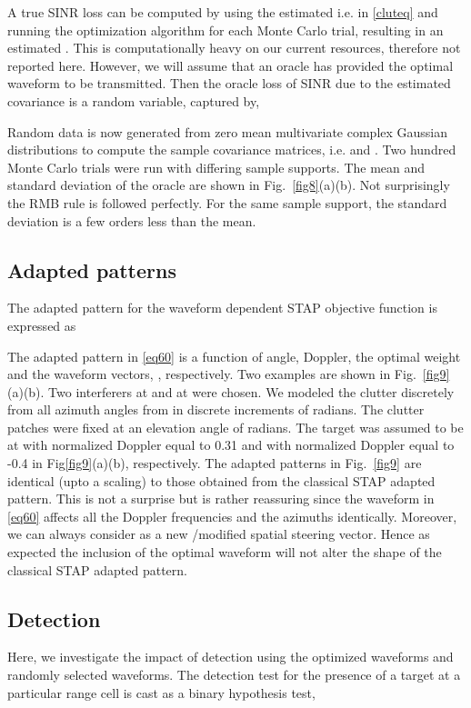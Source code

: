 \documentclass[11pt,draftclsnofoot,onecolumn]{IEEEtran}
\theoremstyle{definition}
\theoremstyle{remark}
\begin{document}
A true SINR loss can be computed  by using the estimated i.e.   in \eqref{cluteq}  and running the optimization algorithm for each Monte Carlo trial, resulting in an estimated . This is computationally heavy  on our current resources, therefore not reported here.
However, we will assume that an oracle has provided the optimal waveform to be transmitted. Then the oracle loss of SINR due to the estimated covariance  is a  random variable, captured by,

Random data is now generated from zero mean multivariate complex Gaussian distributions to compute the sample covariance matrices, i.e.  and . Two hundred Monte Carlo trials were run with differing sample supports. The mean and standard deviation of the oracle   are shown in Fig.~\ref{fig8}(a)(b). Not surprisingly the RMB rule is followed perfectly. For the same sample support, the standard deviation is  a few orders less than the mean. 
\subsection{Adapted patterns}
The adapted pattern for the waveform dependent STAP objective function is expressed as

The adapted pattern in \eqref{eq60} is a function of angle, Doppler, the optimal weight and the waveform vectors, , respectively. Two examples are shown in Fig.~\ref{fig9}(a)(b). Two interferers at  and at  were chosen. We modeled the clutter discretely from all azimuth angles from  in discrete increments of  radians. The clutter patches were fixed at an elevation angle of  radians. The target was assumed to be at  with normalized Doppler equal to 0.31 and  with normalized Doppler equal to -0.4 in Fig\ref{fig9}(a)(b), respectively.  The adapted patterns in Fig.~\ref{fig9} are identical (upto a scaling) to those obtained from the classical STAP adapted pattern. This is not a surprise but is rather reassuring since the waveform in \eqref{eq60} affects all the Doppler frequencies and the azimuths identically. Moreover, we can always consider  as a new /modified spatial steering vector. Hence as expected the inclusion of the optimal waveform will not alter the shape of the classical STAP adapted pattern.
\subsection{Detection}
Here, we investigate the impact of detection using the optimized waveforms and randomly selected waveforms. The detection test for the presence of a target at a particular range cell is cast as a binary hypothesis test,
\end{document}
